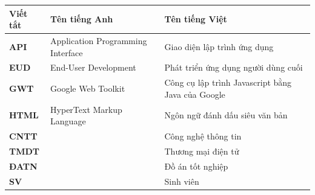 \documentclass[../DoAn.tex]{subfiles}
\begin{document}
\begin{longtable}{l p{6cm} p{7cm}}
	\hline
   \textbf{Viết tắt}  & \textbf{Tên tiếng Anh}	& \textbf{Tên tiếng Việt} \\ \hline 
	\textbf{API} & Application Programming Interface & Giao diện lập trình ứng dụng\\
	\textbf{EUD} & End-User Development & Phát triển ứng dụng người dùng cuối\\
	\textbf{GWT} & Google Web Toolkit & Công cụ lập trình Javascript bằng Java của Google\\
	\textbf{HTML} & HyperText Markup Language & Ngôn ngữ đánh dấu siêu văn bản\\
	\textbf{CNTT }  &   & Công nghệ thông tin\\
        \textbf{TMDT }  &   & Thương mại điện tử\\
	\textbf{ĐATN} &  & Đồ án tốt nghiệp \\
	\textbf{SV} &  & Sinh viên \\

    \hline
\end{longtable}
\end{document}
